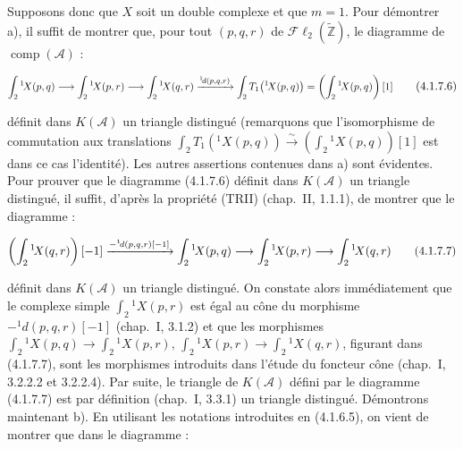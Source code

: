 \clearpage
{}%
\begingroup\small\setlength{\parskip}{0pt}\setlength{\emergencystretch}{1.5em}
\setlength{\abovedisplayskip}{4pt plus 2pt minus 2pt}%
\setlength{\belowdisplayskip}{4pt plus 2pt minus 2pt}%

Supposons donc que $X$ soit un double complexe et que $m=1$. Pour
démontrer a), il suffit de montrer que, pour tout $(p,q,r)$ de
$\mathcal{F}\ell_2(\widetilde{\mathbb Z})$, le diagramme de
$\operatorname{comp}(\mathcal A)$ :

\begin{equation}
\resizebox{0.98\linewidth}{!}{$
\displaystyle
\int_2{}^{1}\!X(p,q)\longrightarrow
\int_2{}^{1}\!X(p,r)\longrightarrow
\int_2{}^{1}\!X(q,r)
\xrightarrow{{}^{1}\!d(p,q,r)}
\int_2T_1\bigl({}^{1}\!X(p,q)\bigr)
=\left(\int_2{}^{1}\!X(p,q)\right)[1]
$}
\tag{4.1.7.6}
\end{equation}

définit dans $K(\mathcal A)$ un triangle distingué (remarquons que
l'isomorphisme de commutation aux translations
$\int_2T_1({}^{1}\!X(p,q))\xrightarrow{\sim}
(\int_2{}^{1}\!X(p,q))[1]$ est dans ce cas l'identité). Les autres
assertions contenues dans a) sont évidentes. Pour prouver que le diagramme
(4.1.7.6) définit dans $K(\mathcal A)$ un triangle distingué, il suffit,
d'après la propriété (TRII) (chap.~II, 1.1.1), de montrer que le diagramme :

\begin{equation}
\resizebox{0.96\linewidth}{!}{$
\displaystyle
\left(\int_2{}^{1}\!X(q,r)\right)[-1]
\xrightarrow{-{}^{1}\!d(p,q,r)[-1]}
\int_2{}^{1}\!X(p,q)\longrightarrow
\int_2{}^{1}\!X(p,r)\longrightarrow
\int_2{}^{1}\!X(q,r)
$}
\tag{4.1.7.7}
\end{equation}

définit dans $K(\mathcal A)$ un triangle distingué. On constate alors
immédiatement que le complexe simple $\int_2{}^{1}\!X(p,r)$ est égal au
cône du morphisme $-{}^{1}\!d(p,q,r)[-1]$ (chap.~I, 3.1.2) et que les
morphismes
$\int_2{}^{1}\!X(p,q)\longrightarrow\int_2{}^{1}\!X(p,r)$,
$\int_2{}^{1}\!X(p,r)\longrightarrow\int_2{}^{1}\!X(q,r)$, figurant dans
(4.1.7.7), sont les morphismes introduits dans l'étude du foncteur cône
(chap.~I, 3.2.2.2 et 3.2.2.4). Par suite, le triangle de $K(\mathcal A)$
défini par le diagramme (4.1.7.7) est par définition (chap.~I, 3.3.1) un
triangle distingué. Démontrons maintenant b). En utilisant les notations
introduites en (4.1.6.5), on vient de montrer que dans le diagramme :

